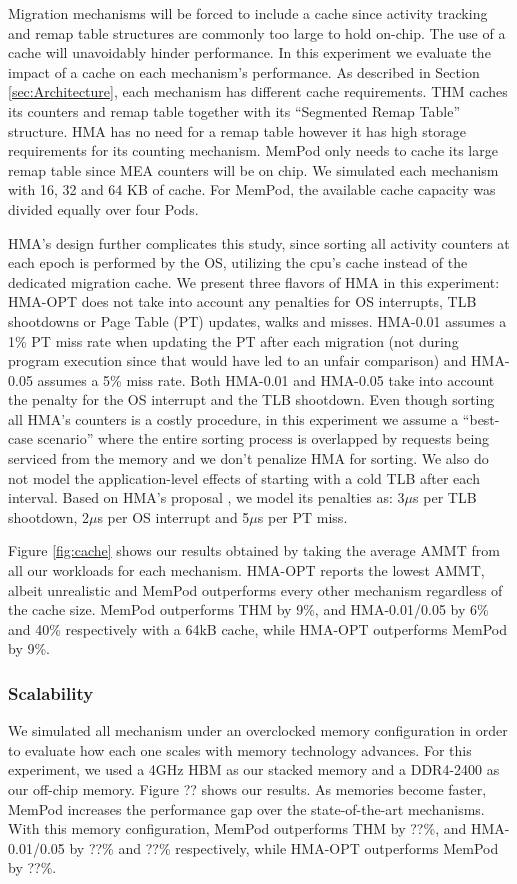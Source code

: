 Migration mechanisms will be forced to include a cache since activity tracking and remap table structures are commonly too large to hold on-chip. The use of a cache will unavoidably hinder performance. In this experiment we evaluate the impact of a cache on each mechanism's performance. As described in Section \ref{sec:Architecture}, each mechanism has different cache requirements. THM caches its counters and remap table together with its ``Segmented Remap Table'' structure. HMA has no need for a remap table however it has high storage requirements for its counting mechanism. MemPod only needs to cache its large remap table since MEA counters will be on chip. We simulated each mechanism with 16, 32 and 64 KB of cache. For MemPod, the available cache capacity was divided equally over four Pods.

HMA's design further complicates this study, since sorting all activity counters at each epoch is performed by the OS, utilizing the cpu's cache instead of the dedicated migration cache. We present three flavors of HMA in this experiment: HMA-OPT does not take into account any penalties for OS interrupts, TLB shootdowns or Page Table (PT) updates, walks and misses. HMA-0.01 assumes a 1\% PT miss rate when updating the PT after each migration (not during program execution since that would have led to an unfair comparison) and HMA-0.05 assumes a 5\% miss rate. Both HMA-0.01 and HMA-0.05 take into account the penalty for the OS interrupt and the TLB shootdown. Even though sorting all HMA's counters is a costly procedure, in this experiment we assume a ``best-case scenario'' where the entire sorting process is overlapped by requests being serviced from the memory and we don't penalize HMA for sorting. We also do not model the application-level effects of starting with a cold TLB after each interval. Based on HMA's proposal \cite{meswani-HPCA21}, we model its penalties as: 3$\mu$s per TLB shootdown, 2$\mu$s per OS interrupt and 5$\mu$s per PT miss.

Figure \ref{fig:cache} shows our results obtained by taking the average AMMT from all our workloads for each mechanism. HMA-OPT reports the lowest AMMT, albeit unrealistic and MemPod outperforms every other mechanism regardless of the cache size. MemPod outperforms THM by 9\%, and HMA-0.01/0.05 by 6\% and 40\% respectively with a 64kB cache, while HMA-OPT outperforms MemPod by 9\%.

\subsubsection{Scalability}

We simulated all mechanism under an overclocked memory configuration in order to evaluate how each one scales with memory technology advances. For this experiment, we used a 4GHz HBM as our stacked memory and a DDR4-2400 as our off-chip memory. Figure ?? shows our results. As memories become faster, MemPod increases the performance gap over the state-of-the-art mechanisms. With this memory configuration, MemPod outperforms THM by ??\%, and HMA-0.01/0.05 by ??\% and ??\% respectively, while HMA-OPT outperforms MemPod by ??\%.